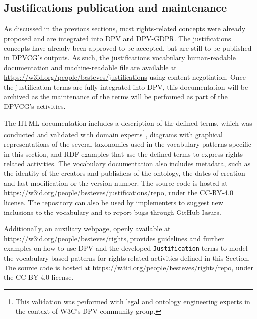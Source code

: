 \subsection{Justifications publication and maintenance}
\label{sec:justifications_publication}

As discussed in the previous sections, most rights-related concepts were already proposed and are integrated into DPV and DPV-GDPR.
The justifications concepts have already been approved to be accepted, but are still to be published in DPVCG's outputs.
As such, the justifications vocabulary human-readable documentation and machine-readable file are available at \url{https://w3id.org/people/besteves/justifications} using content negotiation.
Once the justification terms are fully integrated into DPV, this documentation will be archived as the maintenance of the terms will be performed as part of the DPVCG's activities.

The HTML documentation includes a description of the defined terms, which was conducted and validated with domain experts\footnote{This validation was performed with legal and ontology engineering experts in the context of W3C's DPV community group.}, diagrams with graphical representations of the several taxonomies used in the vocabulary patterns specific in this section, and RDF examples that use the defined terms to express rights-related activities.
The vocabulary documentation also includes metadata, such as the identity of the creators and publishers of the ontology, the dates of creation and last modification or the version number.
The source code is hosted at \url{https://w3id.org/people/besteves/justifications/repo}, under the CC-BY-4.0 license.
The repository can also be used by implementers to suggest new inclusions to the vocabulary and to report bugs through GitHub Issues.

Additionally, an auxiliary webpage, openly available at \url{https://w3id.org/people/besteves/rights}, provides guidelines and further examples on how to use DPV and the developed \texttt{Justification} terms to model the vocabulary-based patterns for rights-related activities defined in this Section.
The source code is hosted at \url{https://w3id.org/people/besteves/rights/repo}, under the CC-BY-4.0 license.